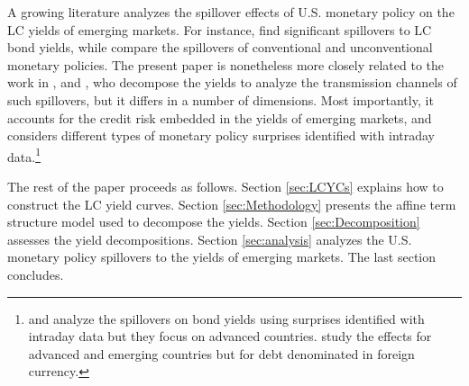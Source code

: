 {A growing literature analyzes the spillover effects of U.S. monetary policy on the LC yields of emerging markets. For instance, \cite{HausmanWongswan:2011} find significant spillovers to LC bond yields, while \cite{BowmanLondonoSapriza:2015} compare the spillovers of conventional and unconventional monetary policies. The present paper is nonetheless more closely related to the work in \cite{CurcuruKaminLiRodriguez:2018}, \cite{ACDM:2019} and \cite{Albaglietal:2019}, who decompose the yields to analyze the transmission channels of such spillovers, but it differs in a number of dimensions. Most importantly, it accounts for the credit risk embedded in the yields of emerging markets, and considers different types of monetary policy surprises identified with intraday data.\footnote{\cite{RogersScottiWright:2014} and \cite{RogersScottiWright:2018} analyze the spillovers on bond yields using surprises identified with intraday data but they focus on advanced countries. \cite{GilchristYueZakrajsek:2019} study the effects for advanced and emerging countries but for debt denominated in foreign currency.}

The rest of the paper proceeds as follows. 
Section \ref{sec:LCYCs} explains how to construct the LC yield curves. Section \ref{sec:Methodology} presents the affine term structure model used to decompose the yields.
Section \ref{sec:Decomposition} assesses the yield decompositions.
Section \ref{sec:analysis} analyzes the U.S. monetary policy spillovers to the yields of emerging markets.
The last section concludes.




}
